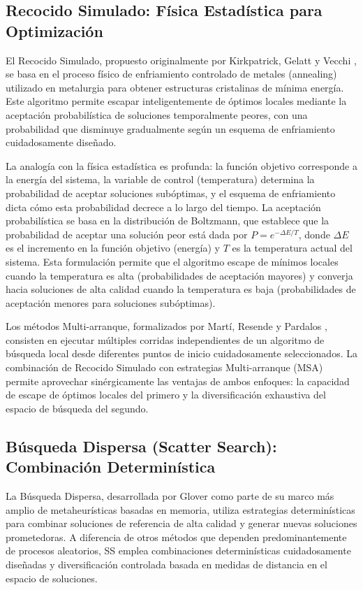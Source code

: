 \subsection{Recocido Simulado: Física Estadística para Optimización}

El Recocido Simulado, propuesto originalmente por Kirkpatrick, Gelatt y Vecchi \cite{kirkpatrick1983optimization}, se basa en el proceso físico de enfriamiento controlado de metales (annealing) utilizado en metalurgia para obtener estructuras cristalinas de mínima energía. Este algoritmo permite escapar inteligentemente de óptimos locales mediante la aceptación probabilística de soluciones temporalmente peores, con una probabilidad que disminuye gradualmente según un esquema de enfriamiento cuidadosamente diseñado.

La analogía con la física estadística es profunda: la función objetivo corresponde a la energía del sistema, la variable de control (temperatura) determina la probabilidad de aceptar soluciones subóptimas, y el esquema de enfriamiento dicta cómo esta probabilidad decrece a lo largo del tiempo. La aceptación probabilística se basa en la distribución de Boltzmann, que establece que la probabilidad de aceptar una solución peor está dada por $P = e^{-\Delta E / T}$, donde $\Delta E$ es el incremento en la función objetivo (energía) y $T$ es la temperatura actual del sistema. Esta formulación permite que el algoritmo escape de mínimos locales cuando la temperatura es alta (probabilidades de aceptación mayores) y converja hacia soluciones de alta calidad cuando la temperatura es baja (probabilidades de aceptación menores para soluciones subóptimas).

Los métodos Multi-arranque, formalizados por Martí, Resende y Pardalos \cite{marti2018multistart}, consisten en ejecutar múltiples corridas independientes de un algoritmo de búsqueda local desde diferentes puntos de inicio cuidadosamente seleccionados. La combinación de Recocido Simulado con estrategias Multi-arranque (MSA) permite aprovechar sinérgicamente las ventajas de ambos enfoques: la capacidad de escape de óptimos locales del primero y la diversificación exhaustiva del espacio de búsqueda del segundo.

\subsection{Búsqueda Dispersa (Scatter Search): Combinación Determinística}

La Búsqueda Dispersa, desarrollada por Glover \cite{glover1998template} como parte de su marco más amplio de metaheurísticas basadas en memoria, utiliza estrategias determinísticas para combinar soluciones de referencia de alta calidad y generar nuevas soluciones prometedoras. A diferencia de otros métodos que dependen predominantemente de procesos aleatorios, SS emplea combinaciones determinísticas cuidadosamente diseñadas y diversificación controlada basada en medidas de distancia en el espacio de soluciones.

